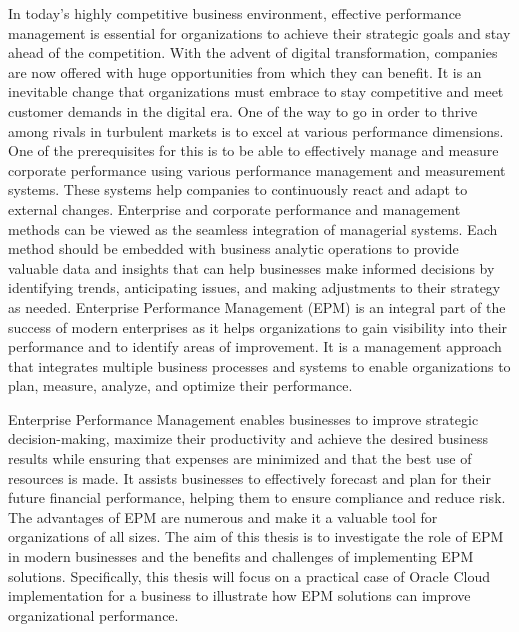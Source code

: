 \documentclass[12pt,a4paper,openright,twoside]{book}
\begin{document}
In today's highly competitive business environment, effective performance management is essential for organizations to achieve their strategic goals and stay ahead of the competition.
%
With the advent of digital transformation, companies are now offered with huge opportunities from which they can benefit.
%
It is an inevitable change that organizations must embrace to stay competitive and meet customer demands in the digital era.
%
One of the way to go in order to thrive among rivals in turbulent markets is to excel at various performance dimensions. 
%
One of the prerequisites for this is to be able to effectively manage and measure corporate performance using various performance management and measurement systems. 
%
These systems help companies to continuously react and adapt to external changes.
%
Enterprise and corporate performance and management methods can be viewed as the seamless integration of managerial systems. 
%
Each method should be embedded with business analytic operations to provide valuable data and insights that can help businesses make informed decisions by identifying trends, anticipating issues, and making adjustments to their strategy as needed.
%
Enterprise Performance Management (EPM) is an integral part of the success of modern enterprises as it helps organizations to gain visibility into their performance and to identify areas of improvement.
%
It is a management approach that integrates multiple business processes and systems to enable organizations to plan, measure, analyze, and optimize their performance.

Enterprise Performance Management enables businesses to improve strategic decision-making, maximize their productivity and achieve the desired business results while ensuring that expenses are minimized and that the best use of resources is made.
%
It assists businesses to effectively forecast and plan for their future financial performance, helping them to ensure compliance and reduce risk. 
%
The advantages of EPM are numerous and make it a valuable tool for organizations of all sizes.
%
The aim of this thesis is to investigate the role of EPM in modern businesses and the benefits and challenges of implementing EPM solutions. 
%
Specifically, this thesis will focus on a practical case of Oracle Cloud implementation for a business to illustrate how EPM solutions can improve organizational performance. 
\end{document}
